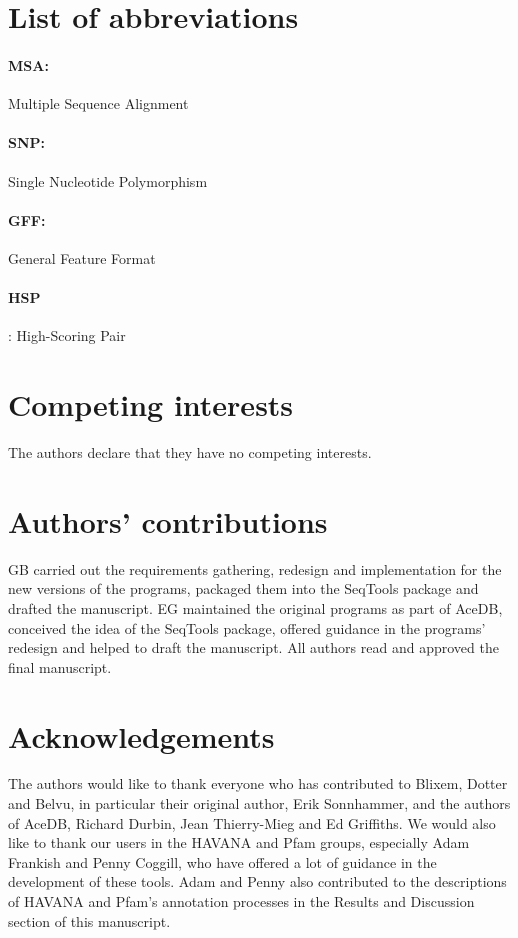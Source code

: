\documentclass[10pt]{bmc_article}
\newenvironment{bmcformat}{\begin{raggedright}\baselineskip20pt\sloppy\setboolean{publ}{false}}{\end{raggedright}\baselineskip20pt\sloppy}
\begin{document}
\begin{bmcformat}
\section*{List of abbreviations}
\paragraph{MSA:} Multiple Sequence Alignment
\paragraph{SNP:} Single Nucleotide Polymorphism
\paragraph{GFF:} General Feature Format
\paragraph{HSP}: High-Scoring Pair


\section*{Competing interests}
The authors declare that they have no competing interests.


\section*{Authors' contributions}
GB carried out the requirements gathering, redesign and implementation for the new versions of the programs, packaged them into the SeqTools package and drafted the manuscript. EG maintained the original programs as part of AceDB, conceived the idea of the SeqTools package, offered guidance in the programs' redesign and helped to draft the manuscript. All authors read and approved the final manuscript.



\section*{Acknowledgements}
The authors would like to thank everyone who has contributed to Blixem, Dotter and Belvu, in particular their original author, Erik Sonnhammer, and the authors of AceDB, Richard Durbin, Jean Thierry-Mieg and Ed Griffiths.  We would also like to thank our users in the HAVANA and Pfam groups, especially Adam Frankish and Penny Coggill, who have offered a lot of guidance in the development of these tools. Adam and Penny also contributed to the descriptions of HAVANA and Pfam's annotation processes in the Results and Discussion section of this manuscript.


\end{bmcformat}
\end{document}

